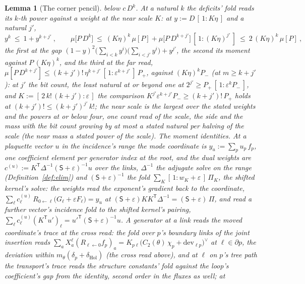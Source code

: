 \documentclass[11pt]{article}
\newtheorem{lemma}{Lemma}
\theoremstyle{definition}
\begin{document}
\begin{lemma}[The corner pencil]
below $c\,D^{k}$. At a natural $k$ the deficits' fold reads its
$k$-th power against a weight at the \emph{near scale} $K$: at
$y:=D\,[\,1:K\eta\,]$ and a natural $j'$,
\[
y^{k}\ \le\ 1+y^{k+j'}\ ,
\qquad
\mu\big[P\,D^{k}\big]\ \le\ (K\eta)^{k}\,\mu[P]
+\mu\big[P\,D^{k+j'}\big]\,[\,1:(K\eta)^{j'}\,]
\ \le\ 2\,(K\eta)^{k}\,\mu[P]\ ,
\]
the first at the gap $(1-y)^{2}\big(\sum_{i<k}y^{i}\big)
\big(\sum_{i<j'}y^{i}\big)+y^{j'}$, the second its moment against
$P\,(K\eta)^{k}$, and the third at the far read,
$\mu[P\,D^{k+j'}]\le(k+j')!\,\eta^{k+j'}\,[\,1:\varepsilon^{k+j'}\,]\,P_+$,
against $(K\eta)^{k}P_-$ (at $m\ge k+j'$): at $j'$ the \emph{bit count}, the least
natural at or beyond one at $2^{j'}\ge P_+\,[\,1:\varepsilon^{k}P_-\,]$, and
$K:=[\,2\,k!\,(k+j'):\varepsilon\,]$ the comparison
$K^{j'}\varepsilon^{k+j'}P_-\ge(k+j')!\,P_+$ holds at
$(k+j')!\le(k+j')^{j'}\,k!$; the near scale is the largest over
the stated weights and the powers at or below four, one count
read of the scale, the side and the mass with the bit count
growing by at most a stated natural per halving of the scale (the
near mass a stated power of the scale).
\emph{The moment identities.} At a plaquette vector $u$ in the
incidence's range the \emph{mode coordinate} is
$y_u:=\sum_pu_p\,f_p$, one coefficient element per generator index
at the root, and the \emph{dual weights} are
$c^{(u)}:=K^{\mathsf T}\Delta^{-1}(\mathsf S+\varepsilon)^{-1}u$
over the links, $\Delta^{-1}$ the adjugate solve on the range
(Definition~\ref{def:elim}) and $(\mathsf S+\varepsilon)^{-1}$ the
fold $\sum_K[\,1:w_K+\varepsilon\,]\,\Pi_K$, the \emph{shifted
kernel}'s solve: the weights read the exponent's gradient back to
the coordinate, $\sum_\ell c^{(u)}_\ell\,R_{0\leftarrow\ell}
\big(G_{\ell}+\varepsilon F_{\ell}\big)=y_u$ at
$(\mathsf S+\varepsilon)KK^{\mathsf T}\Delta^{-1}=(\mathsf S+\varepsilon)\,\Pi$,
and read a further vector's incidence fold to the shifted kernel's
pairing, $\sum_\ell c^{(u)}_\ell(K^{\mathsf T}u')_\ell
=u'^{\mathsf T}(\mathsf S+\varepsilon)^{-1}u$. A generator at a link
reads the moved coordinate's trace at the cross read: the fold over
$p$'s boundary links of the joint insertion reads
$\sum_aX^{\ell}_a(R_{\ell\leftarrow0}f_p)_a
=K_{p\ell}\big(C_2(\theta)\,\chi_p+\mathrm{dev}_{\ell p}\big)^{\!\vee}$
at $\ell\in\partial p$, the deviation within
$m_\theta(\delta_p+\delta_{\mathrm{Hol}})$ (the cross read above),
and at $\ell$ on $p$'s tree path the transport's trace reads the
structure constants' fold against the loop's coefficient's gap from
the identity, second order in the fluxes as well; at

\end{lemma}
\end{document}
